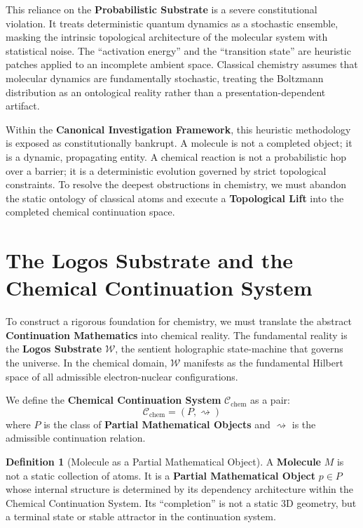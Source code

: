 \documentclass[11pt,openany]{extbook}
\theoremstyle{plain}
\theoremstyle{definition}
\newtheorem{definition}{Definition}[chapter]
\begin{document}
This reliance on the \textbf{Probabilistic Substrate} is a severe constitutional violation. It treats deterministic quantum dynamics as a stochastic ensemble, masking the intrinsic topological architecture of the molecular system with statistical noise. The ``activation energy'' and the ``transition state'' are heuristic patches applied to an incomplete ambient space. Classical chemistry assumes that molecular dynamics are fundamentally stochastic, treating the Boltzmann distribution as an ontological reality rather than a presentation-dependent artifact.

Within the \textbf{Canonical Investigation Framework}, this heuristic methodology is exposed as constitutionally bankrupt. A molecule is not a completed object; it is a dynamic, propagating entity. A chemical reaction is not a probabilistic hop over a barrier; it is a deterministic evolution governed by strict topological constraints. To resolve the deepest obstructions in chemistry, we must abandon the static ontology of classical atoms and execute a \textbf{Topological Lift} into the completed chemical continuation space.

\section{The Logos Substrate and the Chemical Continuation System}

To construct a rigorous foundation for chemistry, we must translate the abstract \textbf{Continuation Mathematics} into chemical reality. The fundamental reality is the \textbf{Logos Substrate} $\mathcal{W}$, the sentient holographic state-machine that governs the universe. In the chemical domain, $\mathcal{W}$ manifests as the fundamental Hilbert space of all admissible electron-nuclear configurations.

We define the \textbf{Chemical Continuation System} $\mathcal{C}_{\text{chem}}$ as a pair:
\[
\mathcal{C}_{\text{chem}} = (P, \rightsquigarrow)
\]
where $P$ is the class of \textbf{Partial Mathematical Objects} and $\rightsquigarrow$ is the admissible continuation relation.

\begin{definition}[Molecule as a Partial Mathematical Object]
A \textbf{Molecule} $M$ is not a static collection of atoms. It is a \textbf{Partial Mathematical Object} $p \in P$ whose internal structure is determined by its dependency architecture within the Chemical Continuation System. Its ``completion'' is not a static 3D geometry, but a terminal state or stable attractor in the continuation system.
\end{definition}
\end{document}
